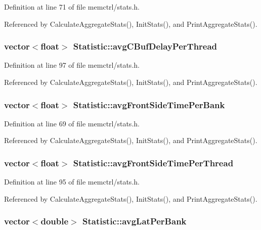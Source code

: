 Definition at line 71 of file memctrl/stats.h.

Referenced by CalculateAggregateStats(), InitStats(), and PrintAggregateStats().
\subsubsection[{avgCBufDelayPerThread}]{\setlength{\rightskip}{0pt plus 5cm}vector$<$float$>$ {\bf Statistic::avgCBufDelayPerThread}}\label{classStatistic_1dd806919a827b7c65c9ac62b5bf5e39}




Definition at line 97 of file memctrl/stats.h.

Referenced by CalculateAggregateStats(), InitStats(), and PrintAggregateStats().
\subsubsection[{avgFrontSideTimePerBank}]{\setlength{\rightskip}{0pt plus 5cm}vector$<$float$>$ {\bf Statistic::avgFrontSideTimePerBank}}\label{classStatistic_1726ccf8d19f4e5bd79ea8427e92c311}




Definition at line 69 of file memctrl/stats.h.

Referenced by CalculateAggregateStats(), InitStats(), and PrintAggregateStats().
\subsubsection[{avgFrontSideTimePerThread}]{\setlength{\rightskip}{0pt plus 5cm}vector$<$float$>$ {\bf Statistic::avgFrontSideTimePerThread}}\label{classStatistic_9019404110219ab38c24306e55cf14d0}




Definition at line 95 of file memctrl/stats.h.

Referenced by CalculateAggregateStats(), InitStats(), and PrintAggregateStats().
\subsubsection[{avgLatPerBank}]{\setlength{\rightskip}{0pt plus 5cm}vector$<$double$>$ {\bf Statistic::avgLatPerBank}}\label{classStatistic_491c14bf3f158a4dca4e7f71640d25af}




